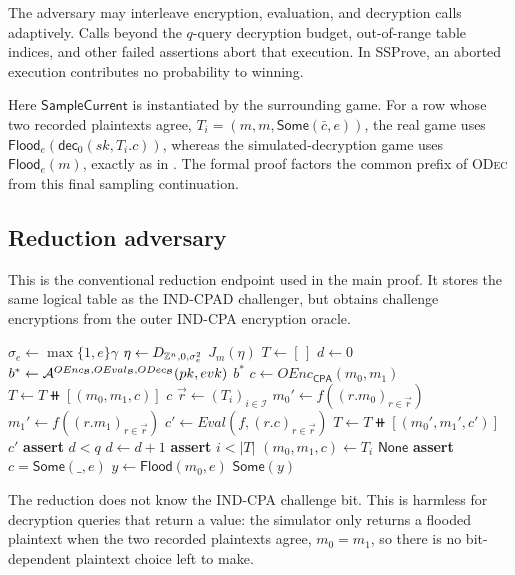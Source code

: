 The adversary may interleave encryption, evaluation, and decryption calls
adaptively.
Calls beyond the \(q\)-query decryption budget, out-of-range table indices,
and other failed assertions abort that execution.
In SSProve, an aborted execution contributes no probability to winning.

Here \(\mathsf{SampleCurrent}\) is instantiated by the surrounding game.
For a row whose two recorded plaintexts agree,
\(T_i=(m,m,\mathsf{Some}(\bar c,e))\), the real game uses
\(\mathsf{Flood}_e(\mathsf{dec}_0(sk,T_i.c))\), whereas the
simulated-decryption game uses \(\mathsf{Flood}_e(m)\), exactly as in
.
The formal proof factors the common prefix of \textsc{ODec} from this final
sampling continuation.

\subsection{Reduction adversary}

\begin{algorithm}
\caption{IND-CPA reduction adversary $\mathcal{B}_{\cA,q}$}
\label{alg:ind-cpa-reduction}
This is the conventional reduction endpoint used in the main proof.
It stores the same logical table as the IND-CPAD challenger, but obtains
challenge encryptions from the outer IND-CPA encryption oracle.
\begin{algorithmic}[1]
    \State $\sigma_e\gets\max\{1,e\}\gamma$
    \State $\eta \gets D_{\mathbb{Z}^n,0,\sigma_e^2}$
    \State \Return $J_m(\eta)$
  \EndProcedure
  \Statex
    \State $T \gets [\,]$
    \State $d \gets 0$
    \State $b^* \gets
      \mathcal{A}^{OEnc_{\mathcal{B}},OEval_{\mathcal{B}},ODec_{\mathcal{B}}}(pk,evk)$
    \State \Return $b^*$
  \EndProcedure
  \Statex
    \State $c \gets OEnc_{\mathsf{CPA}}(m_0,m_1)$
    \State $T \gets T \doubleplus [(m_0,m_1,c)]$
    \State \Return $c$
  \EndProcedure
  \Statex
    \State $\vec r \gets (T_i)_{i\in\mathcal{I}}$
    \State $m_0' \gets f((r.m_0)_{r\in\vec r})$
    \State $m_1' \gets f((r.m_1)_{r\in\vec r})$
    \State $c' \gets Eval(f,(r.c)_{r\in\vec r})$
    \State $T \gets T \doubleplus [(m_0',m_1',c')]$
    \State \Return $c'$
  \EndProcedure
  \Statex
    \State \textbf{assert} $d<q$
    \State $d \gets d+1$
    \State \textbf{assert} $i<|T|$
    \State $(m_0,m_1,c) \gets T_i$
      \State \Return $\mathsf{None}$
    \EndIf
    \State \textbf{assert} $c=\mathsf{Some}(\_,e)$
    \State $y \gets \mathsf{Flood}(m_0,e)$
    \State \Return $\mathsf{Some}(y)$
  \EndProcedure
\end{algorithmic}
\end{algorithm}

\FloatBarrier

The reduction does not know the IND-CPA challenge bit.
This is harmless for decryption queries that return a value: the simulator
only returns a flooded plaintext when the two recorded plaintexts agree,
$m_0=m_1$, so there is no bit-dependent plaintext choice left to make.
